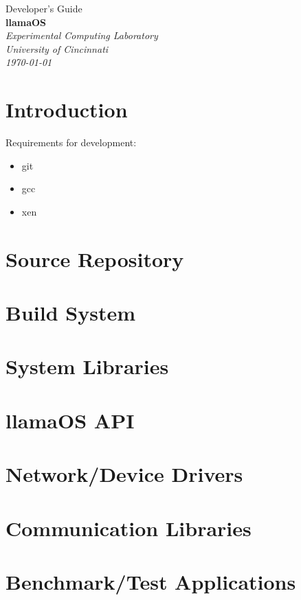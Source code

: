 \documentclass[draft]{article}
\begin{document}

\begin{titlepage}
\raggedleft
{\huge{Developer's Guide}\\[1.0in]}
{\Huge{\textbf{llamaOS}}\\[0.125in]}
{\Large{}}
\vfill
\itshape
Experimental Computing Laboratory\\
University of Cincinnati\\[0.125in]
\today
\end{titlepage}


\tableofcontents
\clearpage


\section{Introduction}

Requirements for development:

\begin{itemize}
  \item git
  \item gcc
  \item xen
\end{itemize}

\section{Source Repository}

\section{Build System}

\section{System Libraries}

\section{llamaOS API}

\section{Network/Device Drivers}

\section{Communication Libraries}

\section{Benchmark/Test Applications}
\end{document}
